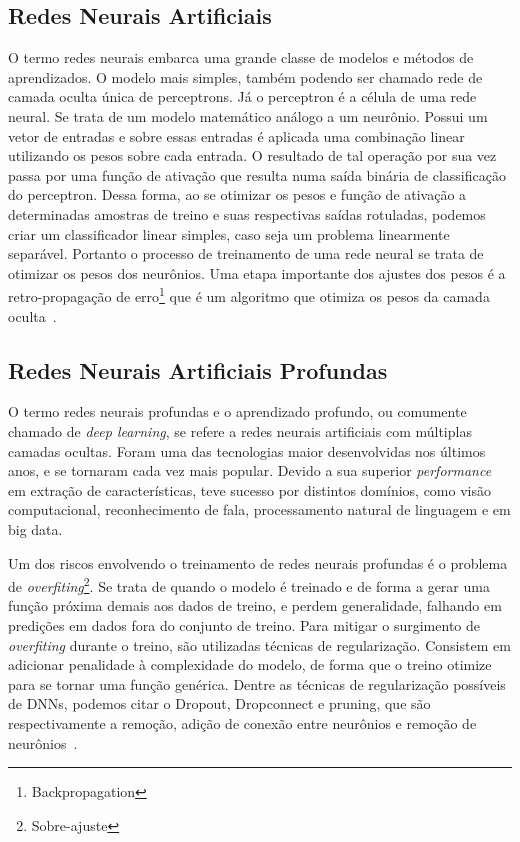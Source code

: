 \subsection{Redes Neurais Artificiais}\label{sec:Cap2_redes_neurais}

O termo redes neurais embarca uma grande classe de modelos e métodos de aprendizados. O modelo mais simples, também podendo ser chamado rede de camada oculta única de perceptrons. Já o  perceptron é a célula de uma rede neural. Se trata de um modelo matemático análogo a um neurônio. Possui um vetor de entradas e sobre essas entradas é aplicada uma combinação linear utilizando os pesos sobre cada entrada. O resultado de tal operação por sua vez passa por uma função de ativação que resulta numa saída binária de classificação do perceptron. Dessa forma, ao se otimizar os pesos e função de ativação a determinadas amostras de treino e suas respectivas saídas rotuladas, podemos criar um classificador linear simples, caso seja um problema linearmente separável. Portanto o processo de treinamento de uma rede neural se trata de otimizar os pesos dos neurônios. Uma etapa importante dos ajustes dos pesos é a retro-propagação de erro\footnote{Backpropagation} que é um algoritmo que otimiza os pesos da camada oculta~\cite{hastie01statisticallearning}.

\subsection{Redes Neurais Artificiais Profundas}\label{sec:Cap2_redes_neurais_profundas}
O termo redes neurais profundas e o aprendizado profundo, ou comumente chamado de \textit{deep learning}, se refere a redes neurais artificiais com múltiplas camadas ocultas. Foram uma das tecnologias maior desenvolvidas nos últimos anos, e se tornaram cada vez mais popular. Devido a sua superior \textit{performance} em extração de características, teve sucesso por distintos domínios, como visão computacional, reconhecimento de fala, processamento natural de linguagem e em big data.

Um dos riscos envolvendo o treinamento de redes neurais profundas é o problema de \textit{overfiting}\footnote{Sobre-ajuste}. Se trata de quando o modelo é treinado e de forma a gerar uma função próxima demais aos dados de treino, e perdem generalidade, falhando em predições em dados fora do conjunto de treino. Para mitigar o surgimento de \textit{overfiting} durante o treino, são utilizadas técnicas de regularização. Consistem em adicionar penalidade à complexidade do modelo, de forma que o treino otimize para se tornar uma função genérica. Dentre as técnicas de regularização possíveis de DNNs, podemos citar o Dropout, Dropconnect e pruning, que são respectivamente a remoção, adição de conexão entre neurônios e remoção de neurônios~\cite{hastie01statisticallearning}.


